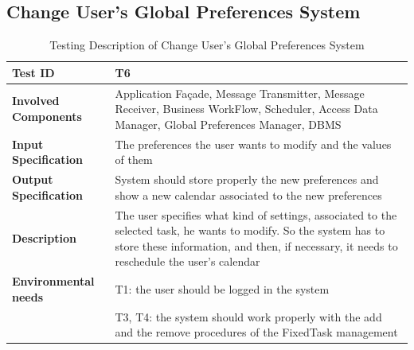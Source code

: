 \subsection*{Change User's Global Preferences System}

\begin{table}[H]
    \centering
    \begin{tabular}{p{4.55cm} p{7cm}}
        
        \hline
        
        \textbf{Test ID}                & T6 \\
        
        \hline
        
        \textbf{Involved Components}    & Application Façade, Message Transmitter, Message Receiver, Business                                          WorkFlow, Scheduler, Access Data Manager, Global Preferences Manager,                                      DBMS\\
        
        \hline
        
        \textbf{Input Specification}    & The preferences the user wants to modify and the values of them\\
        
        \hline
        
        \textbf{Output Specification}   & System should store properly the new preferences and show a new calendar associated to the new preferences\\
        
        \hline
        
        
        \textbf{Description}            & The user specifies what kind of settings, associated to the selected task, he wants to modify. So the system has to store these information, and then, if necessary, it needs to reschedule the user's calendar\\
        \hline
        
        \textbf{Environmental needs}    & T1: the user should be logged in the system\\
                                        & T3, T4: the system should work properly with the add and the remove procedures of the FixedTask management \\
        
        \hline
        
    \end{tabular}
    \caption{Testing Description of Change User's Global Preferences System}
    
\end{table}





